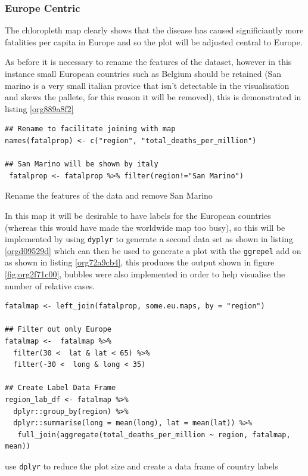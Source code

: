 \documentclass[11pt]{article}
\begin{document}
\subsubsection{Europe Centric}
\label{sec:orgd9124fe}
The chloropleth map clearly shows that the disease has caused significiantly more fatalities
per capita in Europe and so the plot will be adjusted central to Europe.

As before it is necessary to rename the features of the dataset, however in this
instance small European countries such as Belgium should be retained (San marino
is a very small italian provice that isn't detectable in the visualisation and
skews the pallete, for this reason it will be removed), this is demonstrated in
listing \ref{org889a8f2}

\begin{listing}[htbp]
\begin{verbatim}
## Rename to facilitate joining with map
names(fatalprop) <- c("region", "total_deaths_per_million")

## San Marino will be shown by italy
 fatalprop <- fatalprop %>% filter(region!="San Marino")
\end{verbatim}
\caption{\label{org889a8f2}Rename the features of the data and remove San Marino}
\end{listing}

In this map it will be desirable to have labels for the European countries
(whereas this would have made the worldwide map too busy), so this will be
implemented by using \texttt{dyplyr} to generate a second data set as shown in listing
\ref{orgd09529d} which can then be used to generate a plot with the \texttt{ggrepel} add on as shown in listing \ref{org72a9cb4}, this
produces the output shown in figure \ref{fig:org2f71c00}, bubbles were also implemented in order to help visualise the number of relative cases.

\begin{listing}[htbp]
\begin{verbatim}
fatalmap <- left_join(fatalprop, some.eu.maps, by = "region")

## Filter out only Europe
fatalmap <-  fatalmap %>%
  filter(30 <  lat & lat < 65) %>%
  filter(-30 <  long & long < 35)

## Create Label Data Frame
region_lab_df <- fatalmap %>%
  dplyr::group_by(region) %>%
  dplyr::summarise(long = mean(long), lat = mean(lat)) %>%
   full_join(aggregate(total_deaths_per_million ~ region, fatalmap, mean))
\end{verbatim}
\caption{\label{orgd09529d}use \texttt{dplyr} to reduce the plot size and create a data frame of country labels}
\end{listing}
\end{document}
